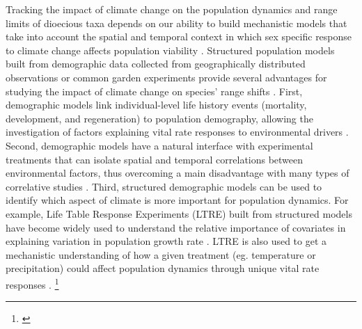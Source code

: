 \documentclass[12pt]{article}\usepackage[]{graphicx}\usepackage[dvipsnames]{xcolor}
\newcommand{\tom}[2]{{\color{red}{#1}}\footnote{\textit{\color{red}{#2}}}}
\begin{document}
Tracking the impact of climate change on the population dynamics and range limits of dioecious taxa depends on our ability to build mechanistic models that take into account the spatial and temporal context in which sex specific response to climate change affects population viability \citep{davis2001range,evans2016towards,czachura2020demographic}.
Structured population models built from demographic data collected from geographically distributed observations or common garden experiments provide several advantages for studying the impact of climate change on species' range shifts \citep{merow2017climate,schwinning2022common,schultz2022climate}.
First, demographic models link individual-level life history events (mortality, development, and regeneration) to population demography, allowing the investigation of factors explaining vital rate responses to environmental drivers \citep{ehrlen2015predicting,louthan2022climate,dahlgren2016demography}. 
Second, demographic models have a natural interface with experimental treatments that can isolate spatial and temporal correlations between environmental factors, thus overcoming a main disadvantage with many types of correlative studies \citep{leicht2007comparative}. 
Third, structured demographic models can be used to identify which aspect of climate is more important for population dynamics.
For example, Life Table Response Experiments (LTRE) built from structured models have become widely used to understand the relative importance of covariates in explaining variation in population growth rate  \citep{ellner2016data,hernandez2023exact}.
LTRE is also used to get a mechanistic understanding of how a given treatment (eg. temperature or precipitation) could affect population dynamics through unique vital rate responses \citep {caswell1989analysis,o2024nonlinear,morrison2007demographic,iler2019reproductive}. \tom{}{It is noticeable that you never mention SDMs as a point of contrast with demographic models. Are you intentionally avoiding that?}
\end{document}
